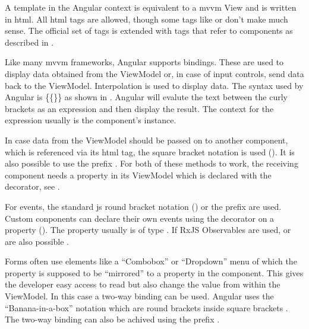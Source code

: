 A template in the Angular context is equivalent to a \gls{mvvm} View and is written in \gls{html}. All \gls{html} tags are allowed, though some tags like  or  don't make much sense. The official set of tags is extended with tags that refer to components as described in .


Like many \gls{mvvm} frameworks, Angular supports bindings. These are used to display data obtained from the ViewModel or, in case of input controls, send data back to the ViewModel. Interpolation is used to display data. The syntax used by Angular is \{\{\}\} as shown in . Angular will evalute the text between the curly brackets as an expression and then display the result. The context for the expression usually is the component's instance.

In case data from the ViewModel should be passed on to another component, which is referenced via its \gls{html} tag, the square bracket notation is used (). It is also possible to use the  prefix \zB {}. For both of these methods to work, the receiving component needs a property in its ViewModel which is declared with the  decorator, see .

For events, the standard \gls{js} round bracket notation () or the  prefix \zB {} are used. Custom conponents can declare their own events using the  decorator on a property (). The property usually is of type . If RxJS Observables are used,  or  are also possible \cite{rxjs}.

Forms often use elements like a \enquote{Combobox} or \enquote{Dropdown} menu of which the  property is supposed to be \enquote{mirrored} to a property in the component. This gives the developer easy access to read but also change the value from within the ViewModel. In this case a two-way binding can be used. Angular uses the \enquote{Banana-in-a-box} notation which are round brackets inside square brackets \zB {}. The two-way binding can also be achived using the  prefix \zB {}.

